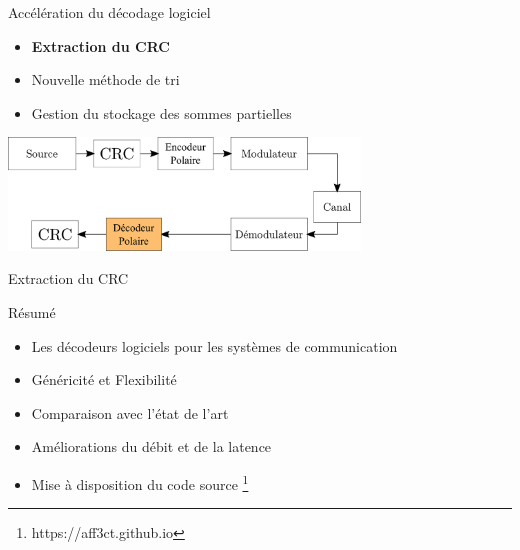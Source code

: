 \begin{frame}[c]{Accélération du décodage logiciel}
  \only<+>
  {
	\begin{itemize}
		\vfill
		\item \textbf{Extraction du CRC}
		\vfill
		\item Nouvelle méthode de tri
		\vfill
		\item Gestion du stockage des sommes partielles
		\vfill
	\end{itemize}
  }
\end{frame}


\begin{frame}
\vfill
\centering
  \includegraphics[width=0.7\textwidth]{./fig/extract-1}
  \vfill
\end{frame}

\begin{frame}[c]{Extraction du CRC}
	\centering

\end{frame}

\begin{frame}[c]{Résumé}
	\begin{itemize}
		\vfill
		\item Les décodeurs logiciels pour les systèmes de communication
		\vfill
		\item Généricité et Flexibilité
		\vfill
		\item Comparaison avec l'état de l'art
		\vfill
		\item Améliorations du débit et de la latence
		\vfill
    \item Mise à disposition du code source \footnote{https://aff3ct.github.io}
    \vfill
	\end{itemize}
\end{frame}

